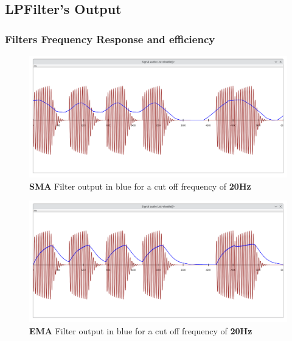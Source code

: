 \newpage

\subsection{LPFilter's Output}

\subsubsection{Filters Frequency Response and efficiency}

\begin{figure}[!h]
	\begin{center}
		\includegraphics[width=15cm]{images/LP1600.png}
	\end{center}
	\caption{\textbf{SMA} Filter output in blue for a cut off frequency of \textbf{20Hz}}
\end{figure}

\begin{figure}[!h]
	\begin{center}
		\includegraphics[width=15cm]{images/LP240.png}
	\end{center}
	\caption{\textbf{EMA} Filter output in blue for a cut off frequency of \textbf{20Hz}}
\end{figure}

